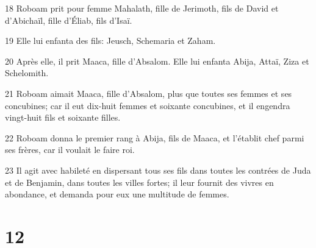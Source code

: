 \par 18 Roboam prit pour femme Mahalath, fille de Jerimoth, fils de David et d'Abichaïl, fille d'Éliab, fils d'Isaï.
\par 19 Elle lui enfanta des fils: Jeusch, Schemaria et Zaham.
\par 20 Après elle, il prit Maaca, fille d'Absalom. Elle lui enfanta Abija, Attaï, Ziza et Schelomith.
\par 21 Roboam aimait Maaca, fille d'Absalom, plus que toutes ses femmes et ses concubines; car il eut dix-huit femmes et soixante concubines, et il engendra vingt-huit fils et soixante filles.
\par 22 Roboam donna le premier rang à Abija, fils de Maaca, et l'établit chef parmi ses frères, car il voulait le faire roi.
\par 23 Il agit avec habileté en dispersant tous ses fils dans toutes les contrées de Juda et de Benjamin, dans toutes les villes fortes; il leur fournit des vivres en abondance, et demanda pour eux une multitude de femmes.

\chapter{12}


